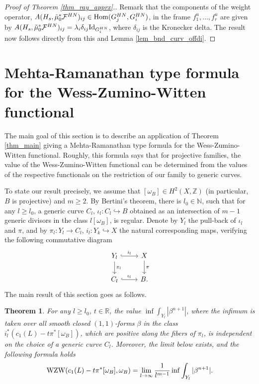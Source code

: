 \documentclass[12pt]{article}
\numberwithin{equation}{section}
\theoremstyle{theorem}
\newtheorem{thm}{Theorem}[section]
\theoremstyle{definition}
\theoremstyle{remark}
\newcommand{\real}{\mathbb{R}}
\newcommand{\nat}{\mathbb{N}}
\begin{document}
	\begin{sloppypar}
	\begin{proof}[Proof of Theorem \ref{thm_ray_apprx}.]
		Remark that the components of the weight operator, $A(H_s, \tilde{\mu}_0^* \mathcal{F}^{HN})_{i j} \in {\rm{Hom}}(G_j^{HN}, G_i^{HN})$, in the frame $f_1^u, \ldots, f_r^u$ are given by $
			A(H_s, \tilde{\mu}_0^* \mathcal{F}^{HN})_{i j}
			=
			\lambda_i \delta_{i j} {\rm{Id}}_{G_i^{HN}}$,
		where $\delta_{i j}$ is the Kronecker delta.
		The result now follows directly from this and Lemma \ref{lem_bnd_curv_offdi}.
	\end{proof}
	\end{sloppypar}
	
	
	\section{Mehta-Ramanathan type formula for the Wess-Zumino-Witten functional}\label{sect_mr}
	\begin{sloppypar}
	The main goal of this section is to describe an application of Theorem \ref{thm_main} giving a Mehta-Ramanathan type formula for the Wess-Zumino-Witten functional.
	Roughly, this formula says that for projective families, the value of the Wess-Zumino-Witten functional can be determined from the values of the respective functionals on the restriction of our family to generic curves.
	\end{sloppypar}
	\par 
	To state our result precisely, we assume that $[\omega_B] \in H^2(X, \mathbb{Z})$ (in particular, $B$ is projective) and $m \geq 2$.
	By Bertini's theorem, there is $l_0 \in \nat$, such that for any $l \geq l_0$, a generic curve $C_l$, $\iota_l: C_l \hookrightarrow B$ obtained as an intersection of $m - 1$ generic divisors in the class $l [\omega_B]$, is regular. 
	Denote by $Y_l$ the pull-back of $\iota_l$ and $\pi$, and by $\pi_l : Y_l \to C_l$, $i_l : Y_k \hookrightarrow X$ the natural corresponding maps, verifying the following commutative diagram
	\begin{equation}\label{eq_sh_exct_seq0}
	\begin{tikzcd}
		Y_l \arrow[hookrightarrow]{r}{i_l} \arrow{d}{\pi_l} & X \arrow{d}{\pi} \\
 		C_l \arrow[hookrightarrow]{r}{\iota_l} & B.
	\end{tikzcd}
	\end{equation}
	The main result of this section goes as follows.
	\begin{thm}\label{thm_mr_wzw}
		For any $l \geq l_0$, $t \in \real$, the value $\inf \int_{Y_l} |\beta^{n + 1}|$, where the infimum is taken over all smooth closed $(1, 1)$-forms $\beta$ in the class $i_l^*( c_1(L) -  t \pi^* [\omega_B])$, which are positive along the fibers of $\pi_l$, is independent on the choice of a generic curve $C_l$.
		Moreover, the limit below exists, and the following formula holds
		\begin{equation}\label{eq_mr_wzw}
			{\rm{WZW}}(c_1(L) - t \pi^* [\omega_B], \omega_B) 
			=
			\lim_{l \to \infty} \frac{1}{l^{m - 1}} \inf \int_{Y_l} |\beta^{n + 1}|.
		\end{equation}
	\end{thm}
\end{document}
